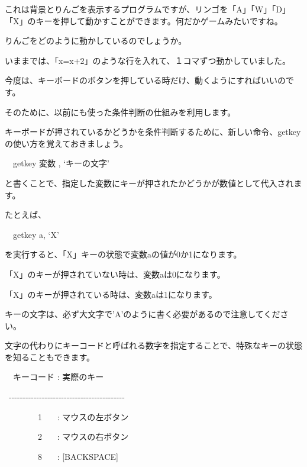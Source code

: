 \documentclass[a4paper,dvipdfmx]{jarticle}
\begin{document}
\bigskip


\bigskip


\bigskip

これは背景とりんごを表示するプログラムですが、リンゴを「A」「W」「D」「X」のキーを押して動かすことができます。何だかゲームみたいですね。


\bigskip

りんごをどのように動かしているのでしょうか。

いままでは、「x=x+2」のような行を入れて、１コマずつ動かしていました。

今度は、キーボードのボタンを押している時だけ、動くようにすればいいのです。

そのために、以前にも使った条件判断の仕組みを利用します。


\bigskip

キーボードが押されているかどうかを条件判断するために、新しい命令、getkeyの使い方を覚えておきましょう。


\bigskip

\ \ getkey 変数 , ‘キーの文字’


\bigskip

と書くことで、指定した変数にキーが押されたかどうかが数値として代入されます。

たとえば、


\bigskip

\ \ getkey a, ‘X’


\bigskip

を実行すると、「X」キーの状態で変数aの値が0か1になります。

「X」のキーが押されていない時は、変数aは0になります。

「X」のキーが押されている時は、変数aは1になります。


\bigskip

キーの文字は、必ず大文字で’A’のように書く必要があるので注意してください。

文字の代わりにキーコードと呼ばれる数字を指定することで、特殊なキーの状態を知ることもできます。


\bigskip

\ \ キーコード : 実際のキー

\ {}-{}-{}-{}-{}-{}-{}-{}-{}-{}-{}-{}-{}-{}-{}-{}-{}-{}-{}-{}-{}-{}-{}-{}-{}-{}-{}-{}-{}-{}-{}-{}-{}-{}-{}-{}-{}-{}-{}-{}-{}-{}-

\ \ \ \ \ \ \ \ 1 \ \ \ : マウスの左ボタン

\ \ \ \ \ \ \ \ 2 \ \ \ : マウスの右ボタン

\ \ \ \ \ \ \ \ 8 \ \ \ : [BACKSPACE]
\end{document}
